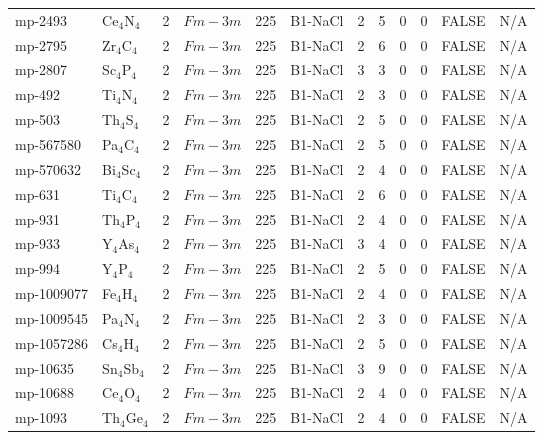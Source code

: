 {\begin{longtable}{llcccccccccc}
    mp-2493 & Ce$_{4}$N$_{4}$ & 2     & $Fm-3m$ & 225   & B1-NaCl & 2     & 5     & 0     & 0     & FALSE & N/A \\
    mp-2795 & Zr$_{4}$C$_{4}$ & 2     & $Fm-3m$ & 225   & B1-NaCl & 2     & 6     & 0     & 0     & FALSE & N/A \\
    mp-2807 & Sc$_{4}$P$_{4}$ & 2     & $Fm-3m$ & 225   & B1-NaCl & 3     & 3     & 0     & 0     & FALSE & N/A \\
    mp-492 & Ti$_{4}$N$_{4}$ & 2     & $Fm-3m$ & 225   & B1-NaCl & 2     & 3     & 0     & 0     & FALSE & N/A \\
    mp-503 & Th$_{4}$S$_{4}$ & 2     & $Fm-3m$ & 225   & B1-NaCl & 2     & 5     & 0     & 0     & FALSE & N/A \\
    mp-567580 & Pa$_{4}$C$_{4}$ & 2     & $Fm-3m$ & 225   & B1-NaCl & 2     & 5     & 0     & 0     & FALSE & N/A \\
    mp-570632 & Bi$_{4}$Sc$_{4}$ & 2     & $Fm-3m$ & 225   & B1-NaCl & 2     & 4     & 0     & 0     & FALSE & N/A \\
    mp-631 & Ti$_{4}$C$_{4}$ & 2     & $Fm-3m$ & 225   & B1-NaCl & 2     & 6     & 0     & 0     & FALSE & N/A \\
    mp-931 & Th$_{4}$P$_{4}$ & 2     & $Fm-3m$ & 225   & B1-NaCl & 2     & 4     & 0     & 0     & FALSE & N/A \\
    mp-933 & Y$_{4}$As$_{4}$ & 2     & $Fm-3m$ & 225   & B1-NaCl & 3     & 4     & 0     & 0     & FALSE & N/A \\
    mp-994 & Y$_{4}$P$_{4}$ & 2     & $Fm-3m$ & 225   & B1-NaCl & 2     & 5     & 0     & 0     & FALSE & N/A \\
    mp-1009077 & Fe$_{4}$H$_{4}$ & 2     & $Fm-3m$ & 225   & B1-NaCl & 2     & 4     & 0     & 0     & FALSE & N/A \\
    mp-1009545 & Pa$_{4}$N$_{4}$ & 2     & $Fm-3m$ & 225   & B1-NaCl & 2     & 3     & 0     & 0     & FALSE & N/A \\
    mp-1057286 & Cs$_{4}$H$_{4}$ & 2     & $Fm-3m$ & 225   & B1-NaCl & 2     & 5     & 0     & 0     & FALSE & N/A \\
    mp-10635 & Sn$_{4}$Sb$_{4}$ & 2     & $Fm-3m$ & 225   & B1-NaCl & 3     & 9     & 0     & 0     & FALSE & N/A \\
    mp-10688 & Ce$_{4}$O$_{4}$ & 2     & $Fm-3m$ & 225   & B1-NaCl & 2     & 4     & 0     & 0     & FALSE & N/A \\
    mp-1093 & Th$_{4}$Ge$_{4}$ & 2     & $Fm-3m$ & 225   & B1-NaCl & 2     & 4     & 0     & 0     & FALSE & N/A \\

\end{longtable}}
